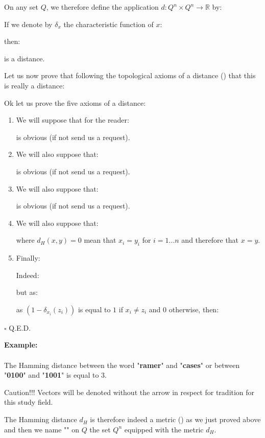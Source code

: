 	
	\begin{theorem}
	On any set $Q$, we therefore define the application $d:Q^n\times Q^n \rightarrow \mathbb{R}$ by:
	
	If we denote by $\delta_x$ the characteristic function of $x$:
	
	then:
	
	is a distance.
	\end{theorem}
	Let us now prove that following the topological axioms of a distance () that this is really a distance:
	\begin{dem}
	Ok let us prove the five axioms of a distance:
	\begin{enumerate}
		\item We will suppose that for the reader:
		
		is obvious (if not send us a request).
		
		\item We will also suppose that:
		
		is obvious (if not send us a request).
		
		\item We will also suppose that:
		
		is obvious (if not send us a request).
		
		\item We will also suppose that:
		
		where $d_H(x,y)=0$ mean that $x_i=y_i$ for $i=1...n$ and therefore that $x=y$.
		
		\item Finally:
		
		Indeed:
		
		but as:
		
		as $(1-\delta_{x_i}(z_i))$ is equal to $1$ if $x_i\neq z_i$ and $0$ otherwise, then:
		
	\end{enumerate}
	\begin{flushright}
		$\square$  Q.E.D.
	\end{flushright}
	\end{dem}
	\begin{tcolorbox}[colframe=black,colback=white,sharp corners]
	\textbf{{\Large {}}Example:}\\\\
	The Hamming distance between the word "\textbf{ramer}" and "\textbf{cases}" or between "\textbf{0100}" and "\textbf{1001}" is equal to $3$.
	\end{tcolorbox}
	\begin{tcolorbox}[title=Remark,colframe=black,arc=10pt]
	Caution!!! Vectors will be denoted without the arrow in respect for tradition for this study field.
	\end{tcolorbox}
	The Hamming distance $d_H$ is therefore indeed a metric () as we just proved above and then we name "" on $Q$ the set $Q^n$ equipped with the metric $d_H$.
		
